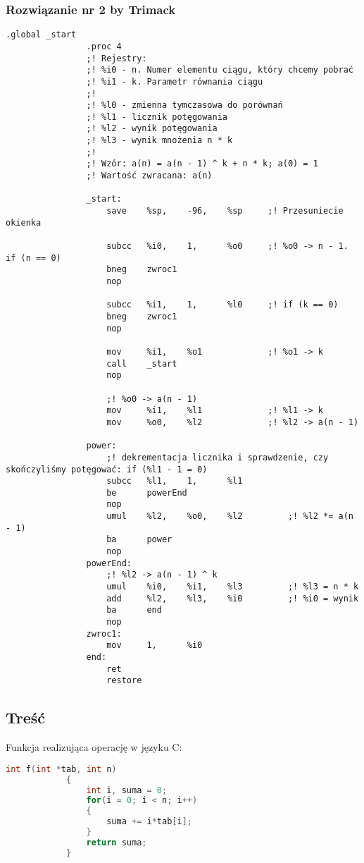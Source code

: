 		\subsubsection{Rozwiązanie nr 2 by Trimack}
			\begin{lstlisting}[language={[sparc]Assembler}]
				.global _start
				.proc 4
				;! Rejestry:
				;! %i0 - n. Numer elementu ciągu, który chcemy pobrać
				;! %i1 - k. Parametr równania ciągu
				;!
				;! %l0 - zmienna tymczasowa do porównań
				;! %l1 - licznik potęgowania
				;! %l2 - wynik potęgowania
				;! %l3 - wynik mnożenia n * k
				;!
				;! Wzór: a(n) = a(n - 1) ^ k + n * k; a(0) = 1
				;! Wartość zwracana: a(n)
				
				_start:
					save	%sp,	-96,	%sp 	;! Przesuniecie okienka
					
					subcc	%i0,	1,		%o0		;! %o0 -> n - 1. if (n == 0)
					bneg	zwroc1
					nop
					
					subcc	%i1,	1,		%l0		;! if (k == 0)
					bneg	zwroc1
					nop
					
					mov		%i1,	%o1				;! %o1 -> k
					call	_start
					nop
				
					;! %o0 -> a(n - 1)
					mov		%i1,	%l1				;! %l1 -> k
					mov		%o0,	%l2				;! %l2 -> a(n - 1)
				
				power:
					;! dekrementacja licznika i sprawdzenie, czy skończyliśmy potęgować: if (%l1 - 1 = 0)
					subcc	%l1,	1,		%l1		
					be		powerEnd
					nop
					umul	%l2,	%o0,	%l2			;! %l2 *= a(n - 1)
					ba		power
					nop
				powerEnd:
					;! %l2 -> a(n - 1) ^ k
					umul	%i0,	%i1,	%l3			;! %l3 = n * k
					add		%l2,	%l3,	%i0			;! %i0 = wynik
					ba		end
					nop
				zwroc1:
					mov		1,		%i0
				end:	
					ret
					restore
			\end{lstlisting}
		\subsection{Treść}
			Funkcja realizująca operację w języku C:
			\begin{lstlisting}[language=C]
			int f(int *tab, int n) 
			{
				int i, suma = 0;
				for(i = 0; i < n; i++)
				{
					suma += i*tab[i];
				}
				return suma;
			}
			\end{lstlisting}

